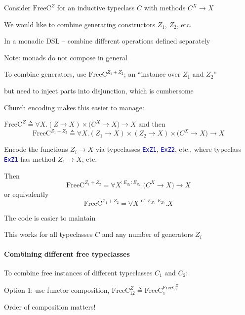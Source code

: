 Consider $\text{FreeC}^{Z}$ for an inductive typeclass $C$ with
methods $C^{X}\rightarrow X$

We would like to combine generating constructors $Z_{1}$, $Z_{2}$,
etc.

In a monadic DSL – combine different operations defined separately

Note: monads do not compose in general

To combine generators, use $\text{FreeC}^{Z_{1}+Z_{2}}$; an \textsf{``}instance
over $Z_{1}$ and $Z_{2}$\textsf{''}

but need to inject parts into disjunction, which is cumbersome

Church encoding makes this easier to manage:

{\footnotesize{}$\text{FreeC}^{Z}\triangleq\forall X.\left(Z\rightarrow X\right)\times\big(C^{X}\rightarrow X\big)\rightarrow X$}
and then {\footnotesize{}
\[
\text{FreeC}^{Z_{1}+Z_{2}}\triangleq\forall X.\left(Z_{1}\rightarrow X\right)\times\left(Z_{2}\rightarrow X\right)\times\big(C^{X}\rightarrow X\big)\rightarrow X
\]
}{\footnotesize\par}

Encode the functions $Z_{i}\rightarrow X$ via typeclasses \texttt{\textcolor{blue}{\footnotesize{}ExZ1}},
\texttt{\textcolor{blue}{\footnotesize{}ExZ2}}, etc., where typeclass
\texttt{\textcolor{blue}{\footnotesize{}ExZ1}} has method $Z_{1}\rightarrow X$,
etc.

Then {\footnotesize{}
\[
\text{FreeC}^{Z_{1}+Z_{2}}=\forall X^{:E_{Z_{1}}:E_{Z_{2}}}.\big(C^{X}\rightarrow X\big)\rightarrow X
\]
}or equivalently{\footnotesize{}
\[
\text{FreeC}^{Z_{1}+Z_{2}}=\forall X^{:C~:E_{Z_{1}}:E_{Z_{2}}}.X
\]
}{\footnotesize\par}

The code is easier to maintain

This works for all typeclasses $C$ and any number of generators $Z_{i}$

\paragraph{Combining different free typeclasses}

To combine free instances of different typeclasses $C_{1}$ and $C_{2}$:

Option 1: use functor composition, $\text{FreeC}_{12}^{Z}\triangleq\text{FreeC}_{1}^{\text{FreeC}_{2}^{Z}}$

Order of composition matters!

